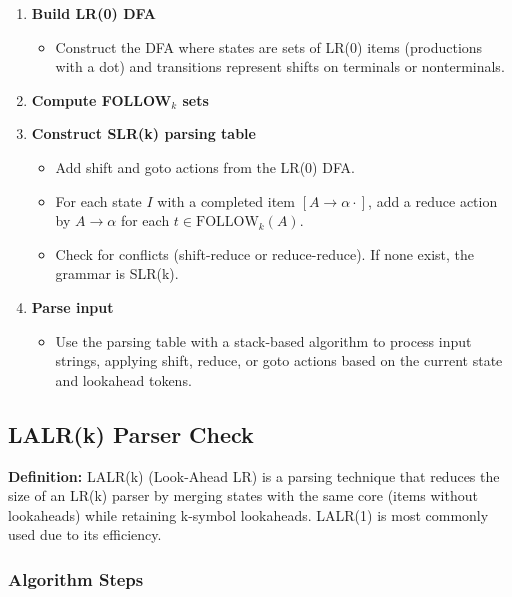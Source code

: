 \begin{enumerate}
    \item \textbf{Build LR(0) DFA}
    \begin{itemize}
        \item Construct the DFA where states are sets of LR(0) items (productions with a dot) and transitions represent shifts on terminals or nonterminals.
    \end{itemize}

    \item \textbf{Compute FOLLOW$_k$ sets}

    \item \textbf{Construct SLR(k) parsing table}
    \begin{itemize}
        \item Add shift and goto actions from the LR(0) DFA.
        \item For each state $I$ with a completed item $[A \to \alpha \cdot]$, add a reduce action by $A \to \alpha$ for each $t \in \text{FOLLOW}_k(A)$.
        \item Check for conflicts (shift-reduce or reduce-reduce). If none exist, the grammar is SLR(k).
    \end{itemize}

    \item \textbf{Parse input}
    \begin{itemize}
        \item Use the parsing table with a stack-based algorithm to process input strings, applying shift, reduce, or goto actions based on the current state and lookahead tokens.
    \end{itemize}
\end{enumerate}

\subsection{LALR(k) Parser Check}

\textbf{Definition:} LALR(k) (Look-Ahead LR) is a parsing technique that reduces the size of an LR(k) parser by merging states with the same core (items without lookaheads) while retaining k-symbol lookaheads. LALR(1) is most commonly used due to its efficiency.

\subsubsection{Algorithm Steps}

